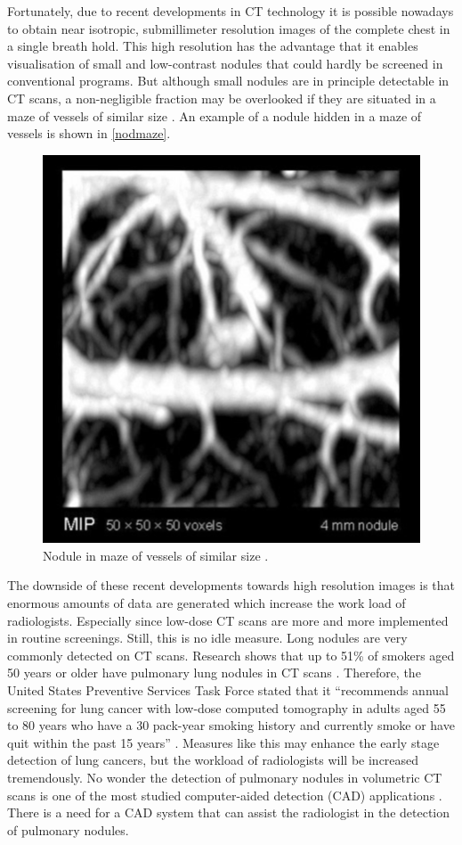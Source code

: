 Fortunately, due to recent developments in CT technology it is possible nowadays
to obtain near isotropic, submillimeter resolution images of the complete chest
in a single breath hold. This high resolution has the advantage that it enables
visualisation of small and low-contrast nodules that could hardly be screened in
conventional programs. But although small nodules are in principle detectable in
CT scans, a non-negligible fraction may be overlooked if they are situated in a
maze of vessels of similar size \cite{ozekes}. An example of a nodule hidden in
a maze of vessels is shown in \autoref{nodmaze}.
\begin{figure}[htp]
\begin{center}
  \includegraphics[width= 30 mm]{img/noduleMaze.png}
  \caption{Nodule in maze of vessels of similar size \cite{wiemkerfig}.}
  \label{nodmaze}
\end{center}
\end{figure}
The downside of these recent developments towards high resolution images is
that enormous amounts of data are generated which increase the work load of radiologists.
Especially since low-dose CT scans are more and more implemented in routine
screenings. Still, this is no idle measure. Long nodules are very commonly
detected on CT scans. Research shows that up to 51\% of smokers aged 50 years or
older have pulmonary lung nodules in CT scans \cite{mahon}. Therefore, the
United States Preventive Services Task Force stated that it ``recommends annual
screening for lung cancer with low-dose computed tomography in adults
aged 55 to 80 years who have a 30 pack-year smoking history and currently smoke
or have quit within the past 15 years'' \cite{ups}. Measures like this may
enhance the early stage detection of lung cancers, but the workload of
radiologists will be increased tremendously. No wonder the detection of
pulmonary nodules in volumetric CT scans is one of the most studied
computer-aided detection (CAD) applications \cite{sluimer}. There is a need for
a CAD system that can assist the radiologist in the detection of pulmonary nodules.

